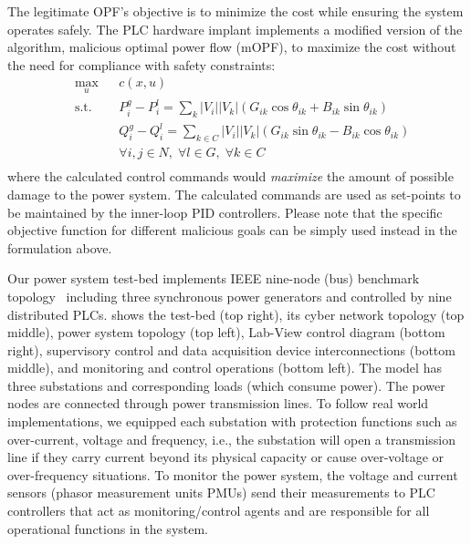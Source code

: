 The legitimate OPF's objective is to minimize the cost while ensuring the system operates safely. The PLC hardware implant implements a modified version of the algorithm, malicious optimal power flow (mOPF), to maximize the cost without the need for compliance with safety constraints: 
\begin{equation} \label{eqn:opf1}
\begin{aligned}
& \underset{u}{\max} & & c(x, u) \\
& \text{s.t.} & &  P_i^g - P_i^l = \sum_{k}{|V_i||V_k| (G_{ik} \cos{\theta_{ik}} + B_{ik} \sin{\theta_{ik}})} \\
& & &  Q_i^g - Q_i^l = \sum_{k \in C}{|V_i||V_k| (G_{ik} \sin{\theta_{ik}} - B_{ik} \cos{\theta_{ik}})} \\
& & &  \forall i,j \in N, \; \forall l \in G, \; \forall k \in C \\
\end{aligned}
\end{equation} 
where the calculated control commands would \textit{maximize} the amount of possible damage to the power system. The calculated commands are used as set-points to be maintained by the inner-loop PID controllers. Please note that the specific objective function for different malicious goals can be simply used instead in the formulation above. 

Our power system test-bed implements IEEE nine-node (bus) benchmark topology~\cite{christie2000power} including three synchronous power generators and controlled by nine distributed PLCs.  shows the test-bed (top right), its cyber network topology (top middle), power system topology (top left), Lab-View control diagram (bottom right), supervisory control and data acquisition device interconnections (bottom middle), and monitoring and control operations (bottom left). The model has three substations and corresponding loads (which consume power). The power nodes are connected through power transmission lines. To follow real world implementations, we equipped each substation with protection functions such as over-current, voltage and frequency, i.e., the substation will open a transmission line if they carry current beyond its physical capacity or cause over-voltage or over-frequency situations. To monitor the power system, the voltage and current sensors (phasor measurement units PMUs) send their measurements to PLC controllers that act as monitoring/control agents and are responsible for all operational functions in the system. 

